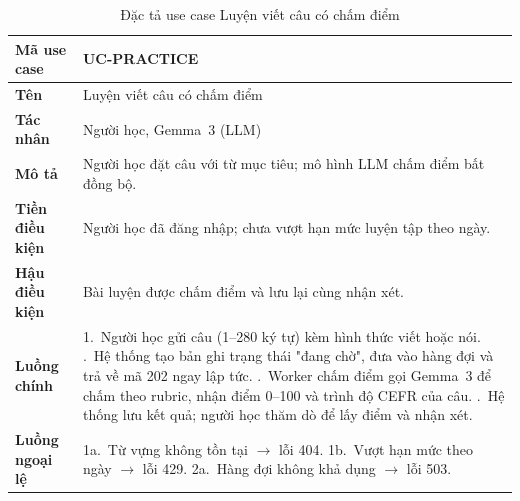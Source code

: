 \begin{table}[H]
  \centering
  \small
  \renewcommand{\arraystretch}{1.3}
  \begin{tabular}{|p{3.0cm}|p{11.4cm}|}
    \hline
    \textbf{Mã use case} & UC-PRACTICE \\ \hline
    \textbf{Tên} & Luyện viết câu có chấm điểm \\ \hline
    \textbf{Tác nhân} & Người học, Gemma~3 (LLM) \\ \hline
    \textbf{Mô tả} & Người học đặt câu với từ mục tiêu; mô hình LLM chấm điểm bất đồng bộ. \\ \hline
    \textbf{Tiền điều kiện} & Người học đã đăng nhập; chưa vượt hạn mức luyện tập theo ngày. \\ \hline
    \textbf{Hậu điều kiện} & Bài luyện được chấm điểm và lưu lại cùng nhận xét. \\ \hline
    \textbf{Luồng chính} &
      1.~Người học gửi câu (1--280 ký tự) kèm hình thức viết hoặc nói. \newline
      2.~Hệ thống tạo bản ghi trạng thái "đang chờ", đưa vào hàng đợi và trả về mã 202 ngay lập tức. \newline
      3.~Worker chấm điểm gọi Gemma~3 để chấm theo rubric, nhận điểm 0--100 và trình độ CEFR của câu. \newline
      4.~Hệ thống lưu kết quả; người học thăm dò để lấy điểm và nhận xét. \\ \hline
    \textbf{Luồng ngoại lệ} &
      1a.~Từ vựng không tồn tại $\rightarrow$ lỗi 404. \newline
      1b.~Vượt hạn mức theo ngày $\rightarrow$ lỗi 429. \newline
      2a.~Hàng đợi không khả dụng $\rightarrow$ lỗi 503. \\ \hline
  \end{tabular}
  \caption{Đặc tả use case Luyện viết câu có chấm điểm}
  \label{tab:uc-practice}
\end{table}

